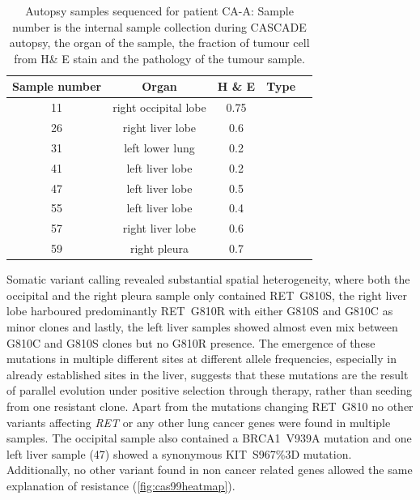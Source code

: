 \begin{table}[ht]
\caption[Autopsy samples sequenced for patient CA-A]{Autopsy samples sequenced for patient CA-A: Sample number is the internal sample collection during CASCADE autopsy, the organ of the sample, the fraction of tumour cell from H\& E stain and the pathology of the tumour sample.}\label{tab:ca99wgsSamples}
\centering
{}
\begin{tabular}{|c|c|c|c|c|}
\toprule
\hline
 \rowcolor{gray!50}
\textbf{Sample number} & \textbf{Organ} & \textbf{H \& E} & \textbf{Type}\\
\hline
 11 & right occipital lobe & 0.75 &  \cellcolor{white}\\
 26 & right liver lobe & 0.6 & \cellcolor{white} \\
 31 & left lower lung & 0.2 & \cellcolor{white} \\
 41 & left liver lobe & 0.2 & \cellcolor{white} \\
 47 & left liver lobe & 0.5 & \cellcolor{white} \\
 55 & left liver lobe & 0.4 & \cellcolor{white} \\
 57 & right liver lobe & 0.6 & \cellcolor{white} \\
 59 & right pleura & 0.7 & \cellcolor{white}\multirow{-8}{*}{lung adenocarcinoma} \\
 \hline
\bottomrule
\end{tabular}
\end{table} 

Somatic variant calling revealed substantial spatial heterogeneity, where both the occipital and the right pleura sample only contained RET~G810S, the right liver lobe harboured predominantly RET~G810R with either G810S and G810C as minor clones and lastly, the left liver samples showed almost even mix between G810C and G810S clones but no G810R presence. The emergence of these mutations in multiple different sites at different allele frequencies, especially in already established sites in the liver, suggests that these mutations are the result of parallel evolution under positive selection through therapy, rather than seeding from one resistant clone.
Apart from the mutations changing RET~G810 no other variants affecting \textit{RET} or any other lung cancer genes were found in multiple samples. The occipital sample also contained a BRCA1~V939A  mutation and one left liver sample (47) showed a synonymous KIT~S967\%3D mutation. Additionally, no other variant found in non cancer related genes allowed the same explanation of resistance (\autoref{fig:cas99heatmap}).

